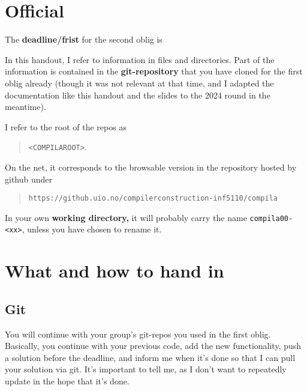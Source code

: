 \documentclass[11pt,freeform]{handout}[2014/08/13]
\begin{document}
\thispagestyle{empty}



\section{Official }
\label{sec:official-info}




\hrulefill{}

The \textbf{deadline/frist}  for the second oblig is

\begin{quote}
  \textbf{\deadlinetwo}
\end{quote}






In this handout, I refer to information in files and directories. Part of
the information is contained in the \textbf{git-repository} that you have
cloned for the first oblig already (though it was not relevant at that
time, and I adapted the documentation like this handout and the slides to
the 2024 round in the meantime).

I refer to the root of the repos as 
\begin{quote}
  \texttt{<COMPILAROOT>}.   
\end{quote}
On the net, it corresponds to the browsable version in the repository
hosted by github under

\begin{quote}
  \texttt{https://github.uio.no/compilerconstruction-inf5110/compila}
\end{quote}

In your own \textbf{working directory,} it will probably carry the name
\texttt{compila00-<xx>}, unless you have chosen to rename it.




\section{What and how to hand in}
\label{sec:what-how}


\subsection{Git}
\label{sec:git}

You will continue with your group's git-repos you used in the first oblig.
Basically, you continue with your previous code, add the new functionality,
push a solution before the deadline, and inform me when it's done so that I
can pull your solution via git. It's important to tell me, as I don't want
to repeatedly update in the hope that it's done.
\end{document}
